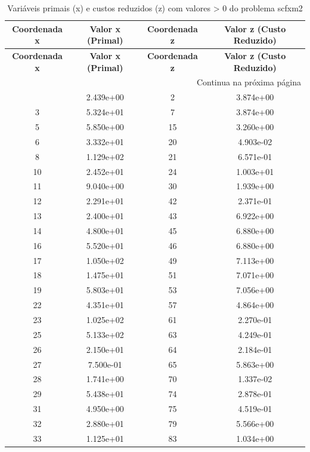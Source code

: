 \documentclass[12pt]{article}
\begin{document}
\begin{longtable}{@{}cccc@{}}
\caption{Variáveis primais (x) e custos reduzidos (z) com valores > 0 do problema scfxm2} \\
\toprule
\textbf{Coordenada x} & \textbf{Valor x (Primal)} & \textbf{Coordenada z} & \textbf{Valor z (Custo Reduzido)} \\
\midrule
\endfirsthead

\toprule
\textbf{Coordenada x} & \textbf{Valor x (Primal)} & \textbf{Coordenada z} & \textbf{Valor z (Custo Reduzido)} \\
\midrule
\endhead

\midrule \multicolumn{4}{r}{{Continua na próxima página}} \\ \midrule
\endfoot

\bottomrule
\endlastfoot
1 & 2.439e+00 & 2 & 3.874e+00 \\
3 & 5.324e+01 & 7 & 3.874e+00 \\
5 & 5.850e+00 & 15 & 3.260e+00 \\
6 & 3.332e+01 & 20 & 4.903e-02 \\
8 & 1.129e+02 & 21 & 6.571e-01 \\
10 & 2.452e+01 & 24 & 1.003e+01 \\
11 & 9.040e+00 & 30 & 1.939e+00 \\
12 & 2.291e+01 & 42 & 2.371e-01 \\
13 & 2.400e+01 & 43 & 6.922e+00 \\
14 & 4.800e+01 & 45 & 6.880e+00 \\
16 & 5.520e+01 & 46 & 6.880e+00 \\
17 & 1.050e+02 & 49 & 7.113e+00 \\
18 & 1.475e+01 & 51 & 7.071e+00 \\
19 & 5.803e+01 & 53 & 7.056e+00 \\
22 & 4.351e+01 & 57 & 4.864e+00 \\
23 & 1.025e+02 & 61 & 2.270e-01 \\
25 & 5.133e+02 & 63 & 4.249e-01 \\
26 & 2.150e+01 & 64 & 2.184e-01 \\
27 & 7.500e-01 & 65 & 5.863e+00 \\
28 & 1.741e+00 & 70 & 1.337e-02 \\
29 & 5.438e+01 & 74 & 2.878e-01 \\
31 & 4.950e+00 & 75 & 4.519e-01 \\
32 & 2.880e+01 & 79 & 5.566e+00 \\
33 & 1.125e+01 & 83 & 1.034e+00 \\

\end{longtable}
\end{document}
